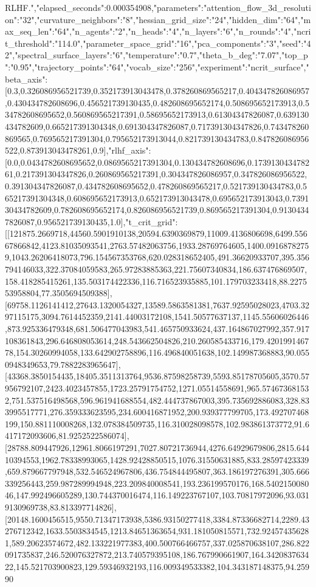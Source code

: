 \documentclass{article}
\begin{document}
RLHF.","elapsed_seconds":0.000354908,"parameters":{"attention_flow_3d_resolution":"32","curvature_neighbors":"8","hessian_grid_size":"24","hidden_dim":"64","max_seq_len":"64","n_agents":"2","n_heads":"4","n_layers":"6","n_rounds":"4","ncrit_threshold":"114.0","parameter_space_grid":"16","pca_components":"3","seed":"42","spectral_surface_layers":"6","temperature":"0.7","theta_b_deg":"7.07","top_p":"0.95","trajectory_points":"64","vocab_size":"256"},"experiment":"ncrit_surface","beta_axis":[0.3,0.326086956521739,0.352173913043478,0.378260869565217,0.404347826086957,0.430434782608696,0.456521739130435,0.482608695652174,0.508695652173913,0.534782608695652,0.560869565217391,0.58695652173913,0.61304347826087,0.639130434782609,0.665217391304348,0.691304347826087,0.717391304347826,0.743478260869565,0.769565217391304,0.795652173913044,0.821739130434783,0.847826086956522,0.873913043478261,0.9],"rlhf_axis":[0.0,0.0434782608695652,0.0869565217391304,0.130434782608696,0.173913043478261,0.217391304347826,0.260869565217391,0.304347826086957,0.347826086956522,0.391304347826087,0.434782608695652,0.478260869565217,0.521739130434783,0.565217391304348,0.608695652173913,0.652173913043478,0.695652173913043,0.739130434782609,0.782608695652174,0.826086956521739,0.869565217391304,0.91304347826087,0.956521739130435,1.0],"t_crit_grid":[[121875.2669718,44560.5901910138,20594.6390369879,11009.4136806698,6499.55667866842,4123.81035093541,2763.57482063756,1933.28769764605,1400.09168782759,1043.26206418073,796.154567353768,620.028318652405,491.36620933707,395.356794146033,322.37084059583,265.97283885363,221.75607340834,186.637476869507,158.418285415261,135.503174422336,116.716523935885,101.179703233418,88.227553958804,77.3505694509388],[69758.1126141412,27643.1320054327,13589.5863581381,7637.92595028023,4703.3297115175,3094.7614452359,2141.44003172108,1541.50577637137,1145.55606026446,873.925336479348,681.506477043983,541.465750933624,437.164867027992,357.917108361843,296.646808053614,248.543662504826,210.260585433716,179.420199146778,154.30260994058,133.642902758896,116.496840051638,102.149987368883,90.0550948349653,79.7882283965647],[43368.3850154435,18405.3511313764,9536.87598258739,5593.85178705605,3570.57956792107,2423.4023457855,1723.25791754752,1271.05514558691,965.574673681532,751.537516498568,596.961941688554,482.444737867003,395.735692886083,328.833995517771,276.359333623595,234.600416871952,200.939377799705,173.492707468199,150.881110008268,132.078384509735,116.310028098578,102.983861373772,91.6417172093606,81.9252522586074],[28788.809447926,12961.8066197291,7027.80721736944,4276.64929679806,2815.64410394553,1962.78338993065,1428.92428850515,1076.31550631885,833.28597423339,659.879667797948,532.546524967806,436.754844495807,363.186197276391,305.666339256443,259.987289994948,223.209840008541,193.236199570176,168.540215008046,147.992496605289,130.744370016474,116.149223767107,103.70817972096,93.0319130969738,83.813397714826],[20148.1600456515,9550.71347173938,5386.93150277418,3384.87336682714,2289.43276712342,1633.5503834545,1213.84651363654,931.181050815571,732.924574356281,589.20623574672,482.133221977383,400.500766466757,337.025870638107,286.822091735837,246.520076327872,213.740579395108,186.767990661907,164.342083763422,145.521703900823,129.59346932193,116.009349533382,104.343187148375,94.25990
\end{document}
